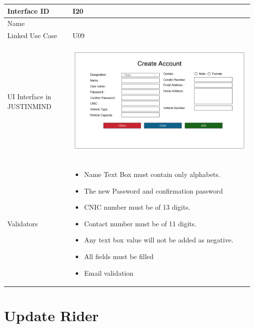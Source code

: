 \documentclass[12pt,a4paper]{report}
\begin{document}
\begin{tabular}{ | m{3cm} | m{12cm}| } \hline

Interface ID & I20  \\\hline

Name  &   \\ \hline

Linked Use Case & U09 \\ \hline

UI Interface in JUSTINMIND & \begin{center} \includegraphics[scale=0.3]{./UIs for Latex Reports/UI-020 AddRider@1x.png}\end{center}  \\ \hline

Validators & 
\begin{itemize}
\item   Name Text Box must contain only alphabets.
\item The new Password and confirmation password
\item CNIC number must be of 13 digits.
\item Contact number must be of 11 digits.
\item Any text box value will not be added as negative.
\item All fields must be filled
\item Email validation


\end{itemize}
\\ \hline

\end{tabular} 
\section{Update Rider }
\end{document}
